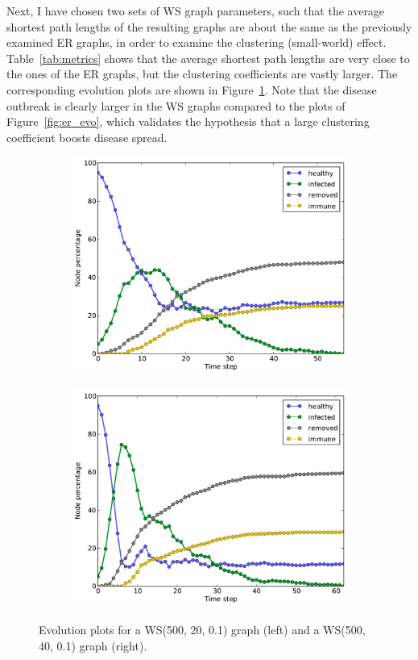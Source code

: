 \documentclass[11pt]{article} %
\begin{document}
Next, I have chosen two sets of WS graph parameters, such that the average
shortest path lengths of the resulting graphs
are about the same as the previously examined ER graphs, in order to
examine the clustering (small-world) effect. Table~\ref{tab:metrics} shows that
the average shortest path lengths are very close to the ones of the ER graphs,
but the clustering coefficients are vastly larger. The corresponding
evolution plots are shown in Figure~\ref{fig:ws_evo}. Note that the disease
outbreak is clearly larger in the WS graphs compared to the plots of
Figure~\ref{fig:er_evo}, which validates the hypothesis that a large clustering
coefficient boosts disease spread.

\begin{figure}[b]
  \begin{subfigure}[b]{0.5\textwidth}
    \centering
    \includegraphics[width=\textwidth]{figures/evo_WS_500_15_01}
  \end{subfigure}
  \begin{subfigure}[b]{0.5\textwidth}
    \centering
    \includegraphics[width=\textwidth]{figures/evo_WS_500_30_01}
  \end{subfigure}
  \caption{Evolution plots for a WS(500, 20, 0.1) graph (left) and a
    WS(500, 40, 0.1) graph (right).}
  \label{fig:ws_evo}
\end{figure}
\end{document}
